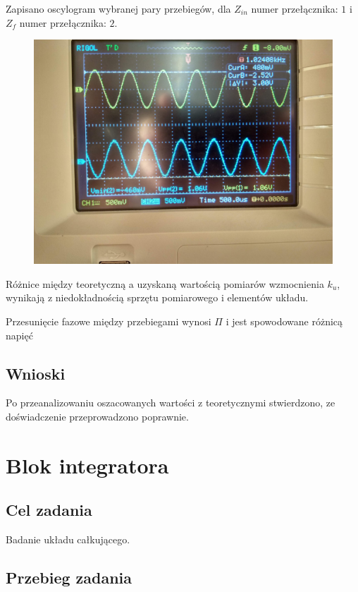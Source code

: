 \documentclass[polish,polish,a4paper]{article}
\begin{document}
\begin{spacing}{1.3}
Zapisano oscylogram wybranej pary przebiegów, dla $Z_{in}$ numer przełącznika: $1$ i $Z_{f}$ numer przełącznika: $2$.

\begin{figure}[H]
	\centering
	\includegraphics[scale=0.1]{141.jpg}
\end{figure}

Różnice między teoretyczną a uzyskaną wartością pomiarów wzmocnienia $k_{u}$, wynikają z niedokładnością sprzętu pomiarowego i elementów układu.

Przesunięcie fazowe między przebiegami wynosi $\Pi$ i jest spowodowane różnicą napięć

\subsection{Wnioski}

Po przeanalizowaniu oszacowanych wartości z teoretycznymi stwierdzono, ze doświadczenie przeprowadzono poprawnie.

\section{Blok integratora} %

\subsection{Cel zadania}

Badanie układu całkującego.

\subsection{Przebieg zadania}


\end{spacing}
\end{document}
